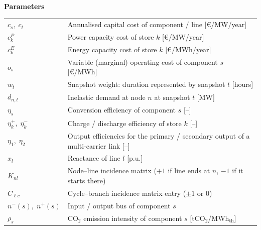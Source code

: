\documentclass{article}
\begin{document}
\medskip
\noindent\textbf{Parameters}\par\smallskip
\noindent\begin{tabular}{lp{11cm}}
$c_s,\; c_l$ & Annualised capital cost of component / line [\euro/MW/year] \\
$c^P_k$ & Power capacity cost of store $k$ [\euro/MW/year] \\
$c^E_k$ & Energy capacity cost of store $k$ [\euro/MWh/year] \\
$o_s$ & Variable (marginal) operating cost of component $s$ [\euro/MWh] \\
$w_t$ & Snapshot weight: duration represented by snapshot $t$ [hours] \\
$d_{n,t}$ & Inelastic demand at node $n$ at snapshot $t$ [MW] \\
$\eta_s$ & Conversion efficiency of component $s$ [--] \\
$\eta^+_k,\; \eta^-_k$ & Charge / discharge efficiency of store $k$ [--] \\
$\eta_1,\; \eta_2$ & Output efficiencies for the primary / secondary output of a
                     multi-carrier link [--] \\
$x_l$ & Reactance of line $l$ [p.u.] \\
$K_{nl}$ & Node--line incidence matrix ($+1$ if line ends at $n$, $-1$ if it starts there) \\
$C_{\ell c}$ & Cycle--branch incidence matrix entry ($\pm 1$ or $0$) \\
$n^-(s),\; n^+(s)$ & Input / output bus of component $s$ \\
$\rho_s$ & CO$_2$ emission intensity of component $s$ [tCO$_2$/MWh$_\mathrm{th}$] \\
\end{tabular}
\end{document}
